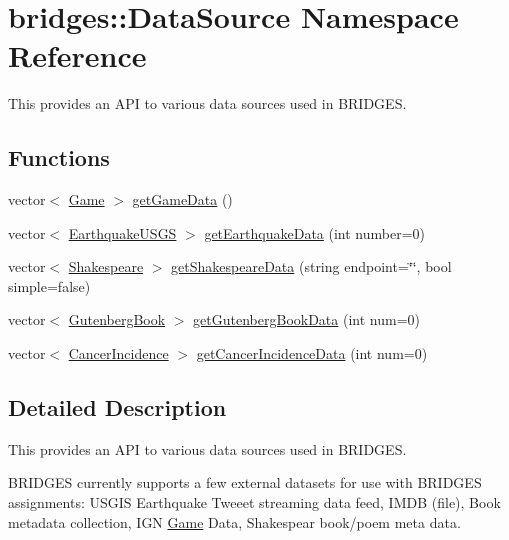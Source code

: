 \hypertarget{namespacebridges_1_1_data_source}{}\section{bridges\+:\+:Data\+Source Namespace Reference}
\label{namespacebridges_1_1_data_source}


This provides an A\+P\+I to various data sources used in B\+R\+I\+D\+G\+E\+S.  


\subsection*{Functions}
\begin{DoxyCompactItemize}
\item 
vector$<$ \hyperlink{classbridges_1_1_game}{Game} $>$ \hyperlink{namespacebridges_1_1_data_source_a96a28cc7f2a6013fe09b07cc53c7432f}{get\+Game\+Data} ()
\item 
vector$<$ \hyperlink{classbridges_1_1_earthquake_u_s_g_s}{Earthquake\+U\+S\+G\+S} $>$ \hyperlink{namespacebridges_1_1_data_source_a2af96553650d859b102f179b3db55389}{get\+Earthquake\+Data} (int number=0)
\item 
vector$<$ \hyperlink{classbridges_1_1_shakespeare}{Shakespeare} $>$ \hyperlink{namespacebridges_1_1_data_source_abdf2e4d709e9b7f1a5370726676d86ec}{get\+Shakespeare\+Data} (string endpoint=\char`\"{}\char`\"{}, bool simple=false)
\item 
vector$<$ \hyperlink{classbridges_1_1_gutenberg_book}{Gutenberg\+Book} $>$ \hyperlink{namespacebridges_1_1_data_source_a8146b00565286727e8206e377d9ff5bd}{get\+Gutenberg\+Book\+Data} (int num=0)
\item 
vector$<$ \hyperlink{classbridges_1_1_cancer_incidence}{Cancer\+Incidence} $>$ \hyperlink{namespacebridges_1_1_data_source_a4f8990ea0e793a6464d95cb82f57c8f9}{get\+Cancer\+Incidence\+Data} (int num=0)
\end{DoxyCompactItemize}


\subsection{Detailed Description}
This provides an A\+P\+I to various data sources used in B\+R\+I\+D\+G\+E\+S. 

B\+R\+I\+D\+G\+E\+S currently supports a few external datasets for use with B\+R\+I\+D\+G\+E\+S assignments\+: U\+S\+G\+I\+S Earthquake Tweeet streaming data feed, I\+M\+D\+B (file), Book metadata collection, I\+G\+N \hyperlink{classbridges_1_1_game}{Game} Data, Shakespear book/poem meta data.

